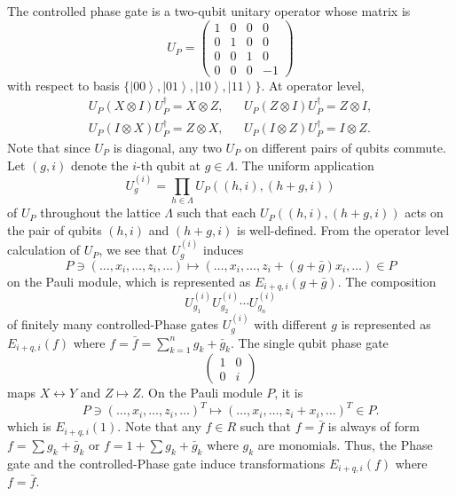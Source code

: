 \documentclass[letterpaper,12pt]{amsart}
\theoremstyle{definition} \newtheorem{defn}{Definition}
\theoremstyle{definition} \newtheorem{rem}{Remark}
\theoremstyle{definition} \newtheorem{example}{Example}
\newcommand{\ket}[1]{\left| {#1} \right\rangle}
\begin{document}
The controlled phase gate is a two-qubit unitary operator whose matrix is
\[
U_P =
 \begin{pmatrix}
  1 & 0 & 0 & 0 \\
  0 & 1 & 0 & 0 \\
  0 & 0 & 1 & 0 \\
  0 & 0 & 0 & -1
 \end{pmatrix}
\]
with respect to basis $\{ \ket{00}, \ket{01}, \ket{10}, \ket{11} \}$.
At operator level,
\begin{align*}
U_P (X \otimes I ) U_P^\dagger = X \otimes Z, & &
U_P (Z \otimes I ) U_P^\dagger = Z \otimes I, \\
U_P (I \otimes X ) U_P^\dagger = Z \otimes X, & &
U_P (I \otimes Z ) U_P^\dagger = I \otimes Z.
\end{align*}
Note that since $U_P$ is diagonal, any two $U_P$ on different pairs of qubits commute.
Let $(g,i)$ denote the $i$-th qubit at $g \in \Lambda$.
The uniform application
\[
U^{(i)}_g = \prod_{h \in \Lambda} U_P( (h,i), (h+g,i) )
\]
of $U_P$ throughout the lattice $\Lambda$
such that each $U_P( (h,i), (h+g,i) )$ acts on the pair of qubits $(h,i)$ and $(h+g,i)$
is well-defined. From the operator level calculation of $U_P$, we see that $U^{(i)}_g$
induces
\[
P \ni (\ldots,x_i,\ldots, z_i, \ldots) \mapsto ( \ldots, x_i,\ldots, z_i + (g+ \bar g)x_i, \ldots ) \in P
\]
on the Pauli module,
which is represented as $E_{i+q,i}(g+\bar g)$. 
The composition
\[
 U^{(i)}_{g_1} U^{(i)}_{g_2} \cdots U^{(i)}_{g_n}
\]
of finitely many controlled-Phase gates $U^{(i)}_g$ with different $g$
is represented as $E_{i+q,i}(f)$ where $f = \bar f = \sum_{k=1}^{n} g_k + \bar g_k$.
The single qubit phase gate
\[
 \begin{pmatrix}
  1 & 0 \\
  0 & i
 \end{pmatrix}
\]
maps $X \leftrightarrow Y$ and $Z \mapsto Z$. On the Pauli module $P$, it is
\[
P \ni (\ldots,x_i,\ldots, z_i, \ldots)^T \mapsto ( \ldots, x_i,\ldots, z_i + x_i, \ldots )^T \in P .
\]
which is $E_{i+q,i}(1)$.
Note that any $f \in R$ such that $f = \bar f$ is always of form
$f = \sum g_k + \bar g_k$ or $f = 1 + \sum g_k + \bar g_k$
where $g_k$ are monomials.
Thus, the Phase gate and the controlled-Phase gate induce
transformations $E_{i+q,i}(f)$ where $f = \bar f$. 
\end{document}

